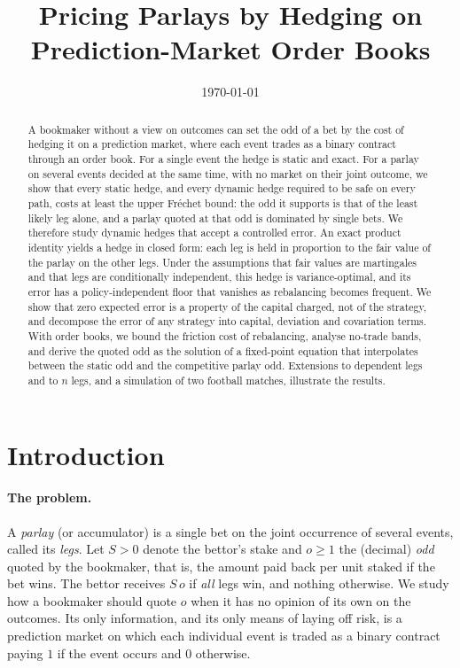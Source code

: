 \documentclass[11pt,a4paper]{article}
\title{Pricing Parlays by Hedging on Prediction-Market Order Books}
\author{}
\date{\today}
\theoremstyle{plain}
\theoremstyle{definition}
\theoremstyle{remark}
\newcommand{\1}{\mathbf{1}}
\begin{document}
\maketitle

\begin{abstract}
A bookmaker without a view on outcomes can set the odd of a bet by the cost of hedging it on a prediction market, where each event trades as a binary contract through an order book. For a single event the hedge is static and exact. For a parlay on several events decided at the same time, with no market on their joint outcome, we show that every static hedge, and every dynamic hedge required to be safe on every path, costs at least the upper Fréchet bound: the odd it supports is that of the least likely leg alone, and a parlay quoted at that odd is dominated by single bets. We therefore study dynamic hedges that accept a controlled error. An exact product identity yields a hedge in closed form: each leg is held in proportion to the fair value of the parlay on the other legs. Under the assumptions that fair values are martingales and that legs are conditionally independent, this hedge is variance-optimal, and its error has a policy-independent floor that vanishes as rebalancing becomes frequent. We show that zero expected error is a property of the capital charged, not of the strategy, and decompose the error of any strategy into capital, deviation and covariation terms. With order books, we bound the friction cost of rebalancing, analyse no-trade bands, and derive the quoted odd as the solution of a fixed-point equation that interpolates between the static odd and the competitive parlay odd. Extensions to dependent legs and to $n$ legs, and a simulation of two football matches, illustrate the results.
\end{abstract}

\section{Introduction}
\label{sec:intro}

\paragraph{The problem.}
A \emph{parlay} (or accumulator) is a single bet on the joint occurrence of several events, called its \emph{legs}. Let $S>0$ denote the bettor's stake and $o\geq 1$ the (decimal) \emph{odd} quoted by the bookmaker, that is, the amount paid back per unit staked if the bet wins. The bettor receives $S\,o$ if \emph{all} legs win, and nothing otherwise. We study how a bookmaker should quote $o$ when it has no opinion of its own on the outcomes. Its only information, and its only means of laying off risk, is a prediction market \cite{WolfersZitzewitz2004} on which each individual event is traded as a binary contract paying $1$ if the event occurs and $0$ otherwise.
\end{document}
